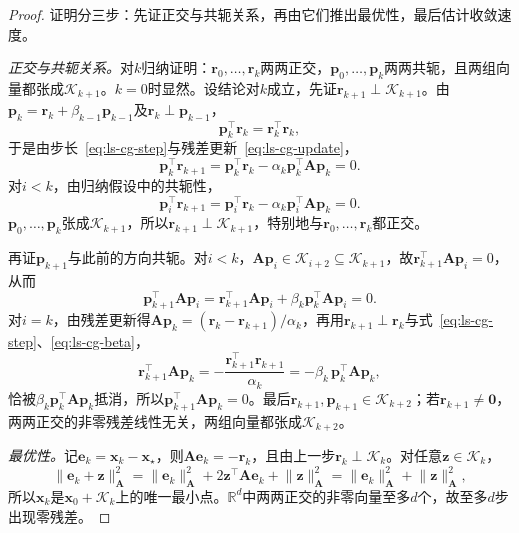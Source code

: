 \begin{proof}
证明分三步：先证正交与共轭关系，再由它们推出最优性，最后估计收敛速度。

\emph{正交与共轭关系。}对$k$归纳证明：$\bm r_0,\ldots,\bm r_k$两两正交，$\bm p_0,\ldots,\bm p_k$两两共轭，且两组向量都张成$\mathcal K_{k+1}$。$k=0$时显然。设结论对$k$成立，先证$\bm r_{k+1}\perp\mathcal K_{k+1}$。由$\bm p_k=\bm r_k+\beta_{k-1}\bm p_{k-1}$及$\bm r_k\perp\bm p_{k-1}$，
\[
 \bm p_k^\top\bm r_k=\bm r_k^\top\bm r_k ,
\]
于是由步长~\eqref{eq:ls-cg-step}与残差更新~\eqref{eq:ls-cg-update}，
\[
 \bm p_k^\top\bm r_{k+1}=\bm p_k^\top\bm r_k-\alpha_k\bm p_k^\top\bm A\bm p_k=0 .
\]
对$i<k$，由归纳假设中的共轭性，
\[
 \bm p_i^\top\bm r_{k+1}=\bm p_i^\top\bm r_k-\alpha_k\bm p_i^\top\bm A\bm p_k=0 .
\]
$\bm p_0,\ldots,\bm p_k$张成$\mathcal K_{k+1}$，所以$\bm r_{k+1}\perp\mathcal K_{k+1}$，特别地与$\bm r_0,\ldots,\bm r_k$都正交。

再证$\bm p_{k+1}$与此前的方向共轭。对$i<k$，$\bm A\bm p_i\in\mathcal K_{i+2}\subseteq\mathcal K_{k+1}$，故$\bm r_{k+1}^\top\bm A\bm p_i=0$，从而
\[
 \bm p_{k+1}^\top\bm A\bm p_i=\bm r_{k+1}^\top\bm A\bm p_i+\beta_k\bm p_k^\top\bm A\bm p_i=0 .
\]
对$i=k$，由残差更新得$\bm A\bm p_k=(\bm r_k-\bm r_{k+1})/\alpha_k$，再用$\bm r_{k+1}\perp\bm r_k$与式~\eqref{eq:ls-cg-step}、\eqref{eq:ls-cg-beta}，
\[
 \bm r_{k+1}^\top\bm A\bm p_k=-\frac{\bm r_{k+1}^\top\bm r_{k+1}}{\alpha_k}=-\beta_k\,\bm p_k^\top\bm A\bm p_k ,
\]
恰被$\beta_k\bm p_k^\top\bm A\bm p_k$抵消，所以$\bm p_{k+1}^\top\bm A\bm p_k=0$。最后$\bm r_{k+1},\bm p_{k+1}\in\mathcal K_{k+2}$；若$\bm r_{k+1}\ne\bm 0$，两两正交的非零残差线性无关，两组向量都张成$\mathcal K_{k+2}$。

\emph{最优性。}记$\bm e_k=\bm x_k-\bm x_\star$，则$\bm A\bm e_k=-\bm r_k$，且由上一步$\bm r_k\perp\mathcal K_k$。对任意$\bm z\in\mathcal K_k$，
\[
 \lVert\bm e_k+\bm z\rVert_{\bm A}^2
 =\lVert\bm e_k\rVert_{\bm A}^2+2\bm z^\top\bm A\bm e_k+\lVert\bm z\rVert_{\bm A}^2
 =\lVert\bm e_k\rVert_{\bm A}^2+\lVert\bm z\rVert_{\bm A}^2 ,
\]
所以$\bm x_k$是$\bm x_0+\mathcal K_k$上的唯一最小点。$\mathbb R^d$中两两正交的非零向量至多$d$个，故至多$d$步出现零残差。


\end{proof}
